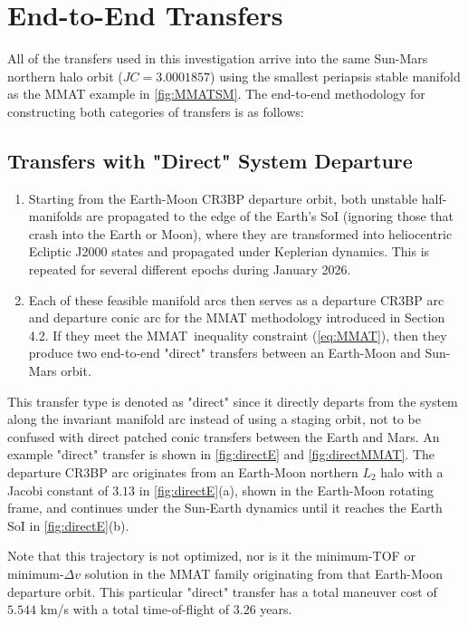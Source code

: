 \section{End-to-End Transfers}
All of the transfers used in this investigation arrive into the same Sun-Mars northern halo orbit
($JC=3.0001857$) using the smallest periapsis stable manifold as the MMAT example in
\cref{fig:MMATSM}. The end-to-end methodology for constructing both categories of transfers is as
follows:

\subsection{Transfers with "Direct" System Departure}
\begin{enumerate}
    \item   Starting from the Earth-Moon CR3BP departure orbit, both unstable half-manifolds are
            propagated to the edge of the Earth's SoI (ignoring those that crash into the Earth or
            Moon), where they are transformed into heliocentric Ecliptic J2000 states and
            propagated under Keplerian dynamics. This is repeated for several different epochs
            during January 2026.
    \item   Each of these feasible manifold arcs then serves as a departure CR3BP arc and departure
            conic arc for the MMAT methodology introduced in Section 4.2. If they meet the MMAT\
            inequality constraint (\cref{eq:MMAT}), then they produce two end-to-end "direct"
            transfers between an Earth-Moon and Sun-Mars orbit.
\end{enumerate}

This transfer type is denoted as "direct" since it directly departs from the system along the
invariant manifold arc instead of using a staging orbit, not to be confused with direct patched
conic transfers between the Earth and Mars. An example "direct" transfer is shown in
\cref{fig:directE} and \cref{fig:directMMAT}. The departure CR3BP arc originates from an Earth-Moon
northern $L_{2}$ halo with a Jacobi constant of $3.13$ in \cref{fig:directE}(a), shown in the
Earth-Moon rotating frame, and continues under the Sun-Earth dynamics until it reaches the Earth
SoI in \cref{fig:directE}(b).

Note that this trajectory is not optimized, nor is it the minimum-TOF or minimum-$\Delta v$
solution in the MMAT family originating from that Earth-Moon departure orbit. This particular
"direct" transfer has a total maneuver cost of $5.544$ km/s with a total time-of-flight of $3.26$
years.

